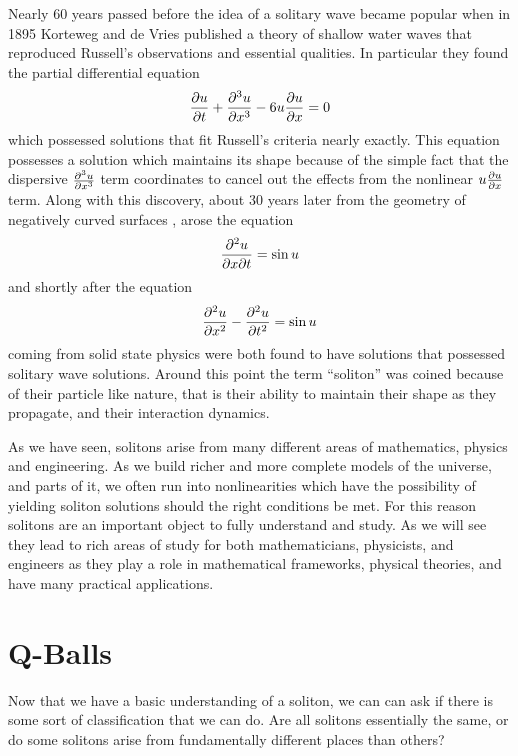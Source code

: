 Nearly 60 years passed before the idea of a solitary wave became popular when in 1895 Korteweg and de Vries \cite{KDV} published a theory of shallow water waves that reproduced Russell's observations and essential qualities. In particular they found the partial differential equation
\begin{equation}
\pdv{u}{t} + \pdv[3]{u}{x} - 6 u \pdv{u}{x} = 0
\end{equation}
which possessed solutions that fit Russell's criteria nearly exactly. This equation possesses a solution which maintains its shape because of the simple fact that the dispersive $\pdv[3]{u}{x}$ term coordinates to cancel out the effects from the nonlinear $u\pdv{u}{x}$ term. Along with this discovery, about 30 years later from the geometry of negatively curved surfaces \cite{curvedsurf}, arose the equation
\begin{equation}
\pdv[2]{u}{x}{t} = \sin{u}
\end{equation}
and shortly after the equation
\begin{equation}
\pdv[2]{u}{x} - \pdv[2]{u}{t} = \sin{u}
\end{equation}
coming from solid state physics \cite{sinegordon} were both found to have solutions that possessed solitary wave solutions. Around this point the term ``soliton'' was coined because of their particle like nature, that is their ability to maintain their shape as they propagate, and their interaction dynamics.

As we have seen, solitons arise from many different areas of mathematics, physics and engineering. As we build richer and more complete models of the universe, and parts of it, we often run into nonlinearities which have the possibility of yielding soliton solutions should the right conditions be met. For this reason solitons are an important object to fully understand and study. As we will see they lead to rich areas of study for both mathematicians, physicists, and engineers as they play a role in mathematical frameworks, physical theories, and have many practical applications.

\section{Q-Balls}\label{sec:qballintro}
Now that we have a basic understanding of a soliton, we can can ask if there is some sort of classification that we can do. Are all solitons essentially the same, or do some solitons arise from fundamentally different places than others?


